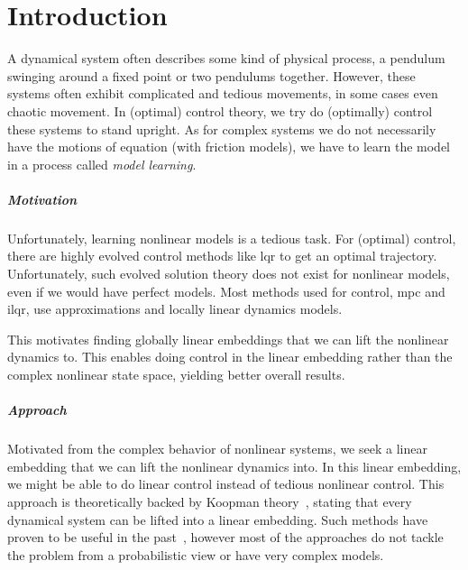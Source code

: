 \chapter{Introduction}
\label{c:introduction}



A dynamical system often describes some kind of physical process, \eg a pendulum swinging around a fixed point or two pendulums together. However, these systems often exhibit complicated and tedious movements, in some cases even chaotic movement. In (optimal) control theory, we try do (optimally) control these systems to \eg stand upright. As for complex systems we do not necessarily have the motions of equation (\eg with friction models), we have to learn the model in a process called \emph{model learning}.

\paragraph{Motivation}
	Unfortunately, learning nonlinear models is a tedious task. For (optimal) control, there are highly evolved control methods like \ac{lqr} to get an optimal trajectory. Unfortunately, such evolved solution theory does not exist for nonlinear models, even if we would have perfect models. Most methods used for control, \eg \ac{mpc} and \ac{ilqr}, use approximations and locally linear dynamics models.

	This motivates finding globally linear embeddings that we can lift the nonlinear dynamics to. This enables doing control in the linear embedding rather than the complex nonlinear state space, yielding better overall results.

\paragraph{Approach}
	Motivated from the complex behavior of nonlinear systems, we seek a linear embedding that we can lift the nonlinear dynamics into. In this linear embedding, we might be able to do linear control instead of tedious nonlinear control. This approach is theoretically backed by Koopman theory~\cite{koopmanHamiltonianSystemsTransformation1931}, stating that every dynamical system can be lifted into a linear embedding. Such methods have proven to be useful in the past~\cite{kaiserDatadrivenDiscoveryKoopman2020,hanDeepLearningKoopman2020,mortonDeepVariationalKoopman2019a}, however most of the approaches do not tackle the problem from a probabilistic view or have very complex models.

